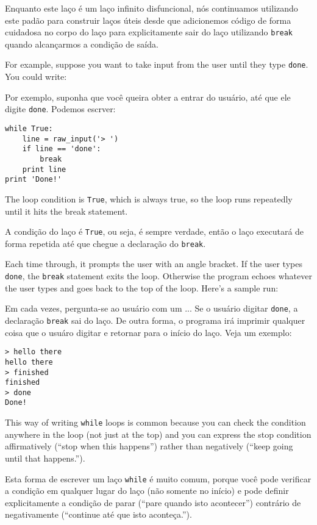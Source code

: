 Enquanto este laço é um laço infinito disfuncional, nós continuamos utilizando
este padão para construir laços úteis desde que adicionemos código de forma
cuidadosa no corpo do laço para explicitamente sair do laço utilizando 
{\tt break} quando alcançarmos a condição de saída.

For example, suppose you want to take input from the user until they
type {\tt done}.  You could write:

Por exemplo, suponha que você queira obter a entrar do usuário, até que ele
digite {\tt done}. Podemos escrver:

\beforeverb
\begin{verbatim}
while True:
    line = raw_input('> ')
    if line == 'done':
        break
    print line
print 'Done!'
\end{verbatim}
\afterverb
%
The loop condition is {\tt True}, which is always true, so the
loop runs repeatedly until it hits the break statement.

%
A condição do laço é {\tt True}, ou seja, é sempre verdade, então o laço
executará de forma repetida até que chegue a declaração do {\tt break}.

Each time through, it prompts the user with an angle bracket.
If the user types {\tt done}, the {\tt break} statement exits
the loop.  Otherwise the program echoes whatever the user types
and goes back to the top of the loop.  Here's a sample run:

Em cada vezes, pergunta-se ao usuário com um ... Se o usuário digitar
{\tt done}, a declaração {\tt break} sai do laço. De outra forma, o programa
irá imprimir qualquer coisa que o usuáro digitar e retornar para o início do
laço. Veja um exemplo:

\beforeverb
\begin{verbatim}
> hello there
hello there
> finished
finished
> done
Done!
\end{verbatim}
\afterverb
%
This way of writing {\tt while} loops is common because you
can check the condition anywhere in the loop (not just at the
top) and you can express the stop condition affirmatively
(``stop when this happens'') rather than negatively (``keep going
until that happens.'').

%
Esta forma de escrever um laço {\tt while} é muito comum, porque você pode
verificar a condição em qualquer lugar do laço (não somente no início) e
pode definir explicitamente a condição de parar (``pare quando isto acontecer'')
contrário de negativamente (``continue até que isto aconteça.'').

